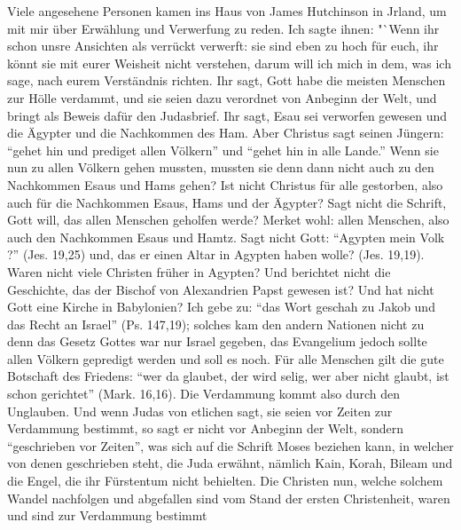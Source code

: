 Viele angesehene Personen kamen ins Haus von James 
Hutchinson in Jrland, um 
mit mir über Erwählung und Verwerfung zu
reden. Ich sagte ihnen: "`Wenn ihr schon unsre Ansichten als
verrückt verwerft: sie sind eben zu hoch für euch, ihr könnt sie
mit eurer Weisheit nicht verstehen, darum will ich mich in dem,
was ich sage, nach eurem Verständnis richten. Ihr sagt, Gott
habe die meisten Menschen zur Hölle verdammt, und sie seien
dazu verordnet von Anbeginn der Welt, und bringt als Beweis
dafür den Judasbrief. Ihr sagt, 
Esau sei verworfen gewesen
und die Ägypter und die Nachkommen des Ham. Aber Christus
sagt seinen Jüngern: "`gehet hin und prediget allen Völkern"' und
"`gehet hin in alle Lande."' Wenn sie nun zu allen Völkern gehen
mussten, mussten sie denn dann nicht auch zu den Nachkommen
Esaus und Hams gehen? Ist nicht Christus für alle gestorben,
also auch für die Nachkommen Esaus, Hams und der Ägypter?
Sagt nicht die Schrift, Gott will, das allen Menschen geholfen werde?
Merket wohl: allen Menschen, also auch den Nachkommen Esaus
und Hamtz. Sagt nicht Gott: "`Agypten mein Volk ?"' 
(Jes. 19,25)
und, das er einen Altar in Agypten haben wolle? 
(Jes. 19,19).
Waren nicht viele Christen früher in Agypten? Und berichtet
nicht die Geschichte, das der Bischof von Alexandrien Papst 
gewesen ist? Und hat nicht Gott eine Kirche in Babylonien? Ich
gebe zu: "`das Wort geschah zu Jakob und das Recht an Israel"'
(Ps. 147,19); solches kam den andern Nationen nicht zu
denn das Gesetz Gottes war nur Israel gegeben, das Evangelium
jedoch sollte allen Völkern gepredigt werden und soll es noch.
Für alle Menschen gilt die gute Botschaft des Friedens: "`wer
da glaubet, der wird selig, wer aber nicht glaubt, ist schon
gerichtet"' (Mark. 16,16). 
Die Verdammung kommt also durch
den Unglauben. Und wenn Judas von etlichen sagt, sie seien
vor Zeiten zur Verdammung bestimmt, so sagt er nicht vor 
Anbeginn der Welt, sondern "`geschrieben vor Zeiten"', was sich auf
die Schrift Moses beziehen kann, in welcher von denen geschrieben
steht, die Juda erwähnt, nämlich Kain, Korah, Bileam und die
Engel, die ihr Fürstentum nicht behielten. Die Christen nun,
welche solchem Wandel nachfolgen und abgefallen sind vom Stand
der ersten Christenheit, waren und sind zur Verdammung bestimmt
